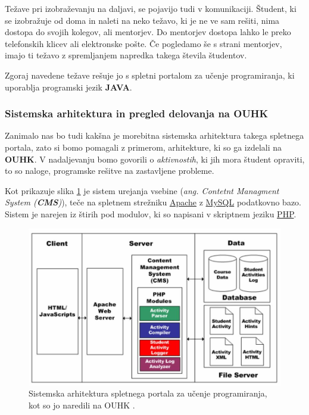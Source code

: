 Težave pri izobraževanju na daljavi, se pojavijo tudi v
komunikaciji. Študent, ki se izobražuje od doma in naleti na neko
težavo, ki je ne ve sam rešiti, nima dostopa do svojih kolegov, ali
mentorjev. Do mentorjev dostopa lahko le preko telefonskih klicev ali
elektronske pošte. Če pogledamo še s strani mentorjev, imajo ti težavo
z spremljanjem napredka takega števila študentov.

Zgoraj navedene težave rešuje jo s spletni portalom za učenje
programiranja, ki uporablja programski jezik \textbf{JAVA}.

\subsubsection{Sistemska arhitektura in pregled delovanja na OUHK}
\label{sec:sistemska_arhitektura_HK}

Zanimalo nas bo tudi kakšna je morebitna sistemska arhitektura takega
spletnega portala, zato si bomo pomagali z primerom, arhitekture, ki
so ga izdelali na \textbf{OUHK}.  V nadaljevanju bomo govorili o
\emph{aktivnostih}, ki jih mora študent opraviti, to so naloge,
programske rešitve na zastavljene probleme.

Kot prikazuje slika \ref{fig:OUHK_cmsArch} je sistem urejanja vsebine
(\emph{ang. Contetnt Managment System (\textbf{CMS})}), teče na
spletnem strežniku \href{http://www.apache.org/}{Apache} z
\href{https://www.mysql.com/}{MySQL} podatkovno bazo. Sistem je
narejen iz štirih pod modulov, ki so napisani v skriptnem jeziku
\href{http://php.net/}{PHP}.

\begin{figure}[htb!] \centering
  \includegraphics[width=0.9\linewidth, keepaspectratio =
1]{./images/SystemArch01_OUHK_DistanceEdu.jpg}
  \caption{Sistemska arhitektura spletnega portala za učenje
    programiranja, kot so jo naredili na OUHK \cite{ITaLCP_DistanceEdu}.}
  \label{fig:OUHK_cmsArch}
\end{figure}

